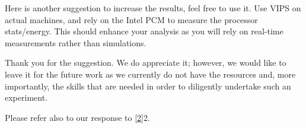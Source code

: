 \begin{reviewer}
Here is another suggestion to increase the results, feel free to use it. Use
VIPS on actual machines, and rely on the Intel PCM to measure the processor
stats/energy. This should enhance your analysis as you will rely on real-time
measurements rather than simulations.
\end{reviewer}

\begin{authors}
Thank you for the suggestion. We do appreciate it; however, we would like to
leave it for the future work as we currently do not have the resources and, more
importantly, the skills that are needed in order to diligently undertake such an
experiment.

Please refer also to our response to \cref{2}{2}.
\end{authors}
